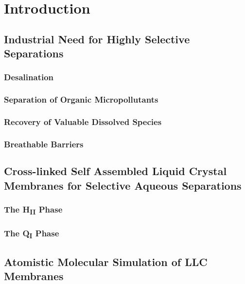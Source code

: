 \chapter{Introduction}\label{chapter:intro}

  \section{Industrial Need for Highly Selective Separations}
  
  \subsection{Desalination}
  
  \subsection{Separation of Organic Micropollutants}
  
  \subsection{Recovery of Valuable Dissolved Species}
  
  \subsection{Breathable Barriers}
  
  \section{Cross-linked Self Assembled Liquid Crystal Membranes for Selective Aqueous Separations}
  
  \subsection{The H\textsubscript{II} Phase}
  
  \subsection{The Q\textsubscript{I} Phase}
  
  \section{Atomistic Molecular Simulation of LLC Membranes}
 